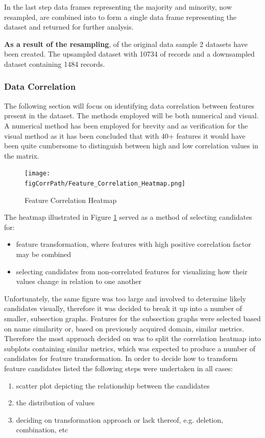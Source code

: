 In the last step data frames representing the majority and minority, now resampled, are combined into to form a single data frame representing the dataset and returned for further analysis.

\textbf{As a result of the resampling}, of the original data sample 2 datasets have been created. The upsampled dataset with 10734 of records and a downsampled dataset containing 1484 records.

\subsubsection{Data Correlation}\label{sec:impl-data-analysis:corr:generic-approach}
The following section will focus on identifying data correlation between features present in the dataset. The methods employed will be both numerical and visual. A numerical method has been employed for brevity and as verification for the visual method as it has been concluded that with 40+ features it would have been quite cumbersome to distinguish between high and low correlation values in the matrix.

\begin{figure}
    \texttt{[image: \\figCorrPath/Feature\_Correlation\_Heatmap.png]}
    \caption{Feature Correlation Heatmap}
    \label{fig:correlation-all-features}
\end{figure}


The heatmap illustrated in Figure \ref{fig:correlation-all-features} served as a method of selecting candidates for:
\begin{itemize}
    \item feature transformation, where features with high positive correlation factor may be combined 
    \item selecting candidates from non-correlated features for visualizing how their values change in relation to one another
\end{itemize}

Unfortunately, the same figure was too large and involved to determine likely candidates visually, therefore it was decided to break it up into a number of smaller, subsection graphs. Features for the subsection graphs were selected based on name similarity or, based on previously acquired domain, similar metrics.
Therefore the most approach decided on was to split the correlation heatmap into subplots containing similar metrics, which was expected to produce a number of candidates for feature transformation. In order to decide how to transform feature candidates listed the following steps were undertaken in all cases:
\begin{enumerate}
    \item scatter plot depicting the relationship between the candidates
    \item the distribution of values 
    \item deciding on transformation approach or lack thereof, e.g. deletion, combination, etc
\end{enumerate}

